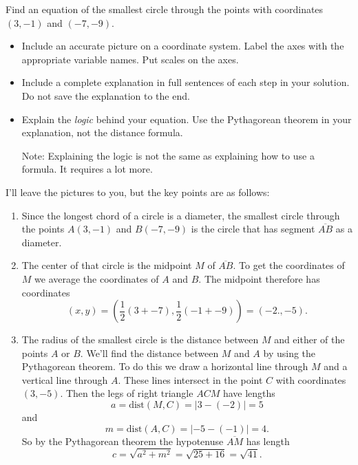 \documentclass{ximera}
\begin{document}
\begin{question} \label{Qpfo3r}
Find an equation of the smallest circle through the points with coordinates $(3,-1)$ and $(-7,-9)$. 
\begin{itemize}

\item Include an accurate picture on a coordinate system. Label the axes with the appropriate variable names. Put scales on the axes.


\item Include a complete explanation in full sentences of each step in your solution. Do not save the explanation to the end.

\item Explain the \emph{logic} behind your equation. Use the Pythagorean theorem in your explanation, not the distance formula.

Note: Explaining the logic is not the same as explaining how to use a formula. It requires a lot more.

\end{itemize}

\begin{explanation}
I'll leave the pictures to you, but the key points are as follows:

\begin{enumerate}
\item Since the longest chord of a circle is a diameter, the smallest circle through the points $A(3,-1)$ and $B(-7,-9)$ is the circle that has segment $\overline{AB}$ as a diameter.

\item The center of that circle is the midpoint $M$ of $\overline{AB}$. To get the coordinates of $M$ we average the coordinates of $A$ and $B$. The midpoint therefore has coordinates
\[
  (x,y) = \left( \frac{1}{2}\left(3+ -7  \right) , \frac{1}{2}\left(-1+ -9  \right) \right) = (-2.,-5).
\]

\item The radius of the smallest circle is the distance between $M$ and either of the points $A$ or $B$. We'll find the distance between $M$ and $A$ by using the Pythagorean theorem. To do this we draw a horizontal line through $M$ and a vertical line through $A$. These lines intersect in the point $C$ with coordinates $(3,-5)$. Then the legs of right triangle $ACM$ have lengths
\[
    a = \text{dist}(M,C) = |3 - (-2)| = 5
\]
and
\[
   m = \text{dist}(A,C) = |-5 - (-1) | = 4 .
\]
So by the Pythagorean theorem the hypotenuse $\overline{AM}$ has length
\[
    c =  \sqrt{a^2 + m^2} = \sqrt{25 + 16} = \sqrt{41}.
\]


\end{enumerate}
\end{explanation}
\end{question}
\end{document}
